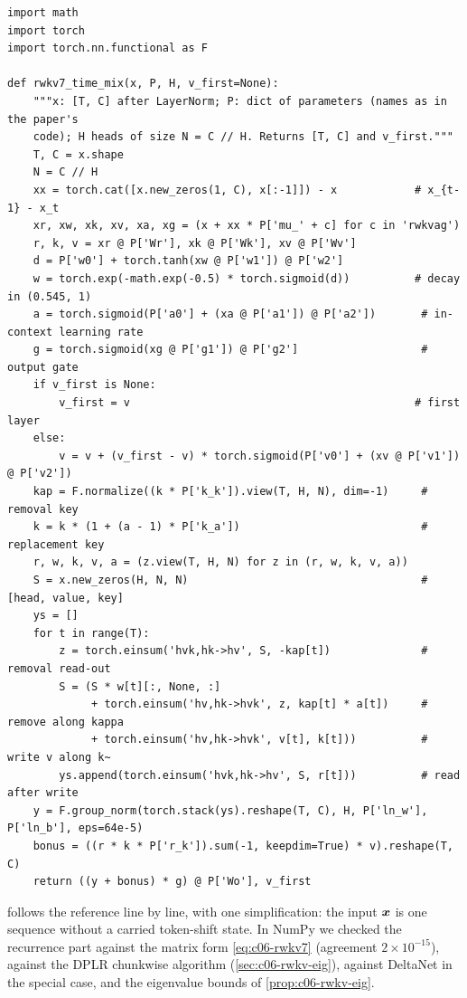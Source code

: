\begin{lstlisting}[caption={Reference implementation (ours): RWKV-7 time mixing, recurrent form},label={lst:c06-rwkv-ours}]
import math
import torch
import torch.nn.functional as F

def rwkv7_time_mix(x, P, H, v_first=None):
    """x: [T, C] after LayerNorm; P: dict of parameters (names as in the paper's
    code); H heads of size N = C // H. Returns [T, C] and v_first."""
    T, C = x.shape
    N = C // H
    xx = torch.cat([x.new_zeros(1, C), x[:-1]]) - x            # x_{t-1} - x_t
    xr, xw, xk, xv, xa, xg = (x + xx * P['mu_' + c] for c in 'rwkvag')
    r, k, v = xr @ P['Wr'], xk @ P['Wk'], xv @ P['Wv']
    d = P['w0'] + torch.tanh(xw @ P['w1']) @ P['w2']
    w = torch.exp(-math.exp(-0.5) * torch.sigmoid(d))          # decay in (0.545, 1)
    a = torch.sigmoid(P['a0'] + (xa @ P['a1']) @ P['a2'])       # in-context learning rate
    g = torch.sigmoid(xg @ P['g1']) @ P['g2']                   # output gate
    if v_first is None:
        v_first = v                                            # first layer
    else:
        v = v + (v_first - v) * torch.sigmoid(P['v0'] + (xv @ P['v1']) @ P['v2'])
    kap = F.normalize((k * P['k_k']).view(T, H, N), dim=-1)     # removal key
    k = k * (1 + (a - 1) * P['k_a'])                            # replacement key
    r, w, k, v, a = (z.view(T, H, N) for z in (r, w, k, v, a))
    S = x.new_zeros(H, N, N)                                    # [head, value, key]
    ys = []
    for t in range(T):
        z = torch.einsum('hvk,hk->hv', S, -kap[t])              # removal read-out
        S = (S * w[t][:, None, :]
             + torch.einsum('hv,hk->hvk', z, kap[t] * a[t])     # remove along kappa
             + torch.einsum('hv,hk->hvk', v[t], k[t]))          # write v along k~
        ys.append(torch.einsum('hvk,hk->hv', S, r[t]))          # read after write
    y = F.group_norm(torch.stack(ys).reshape(T, C), H, P['ln_w'], P['ln_b'], eps=64e-5)
    bonus = ((r * k * P['r_k']).sum(-1, keepdim=True) * v).reshape(T, C)
    return ((y + bonus) * g) @ P['Wo'], v_first
\end{lstlisting}

 follows the reference line by line, with one simplification: the
input $\bm{x}$ is one sequence without a carried token-shift state. In NumPy we checked the
recurrence part against the matrix form \eqref{eq:c06-rwkv7} (agreement $2\times10^{-15}$),
against the DPLR chunkwise algorithm (\cref{sec:c06-rwkv-eig}), against DeltaNet in the special
case, and the eigenvalue bounds of \cref{prop:c06-rwkv-eig}.

